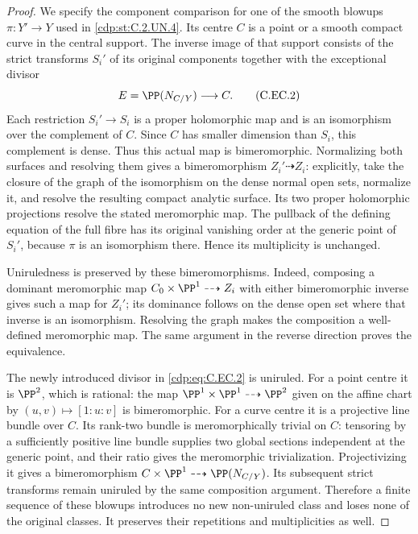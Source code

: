 \begin{proof}
We specify the component comparison for one of the smooth blowups
$\pi:Y'\to Y$ used in \ref{cdp:st:C.2.UN.4}. Its centre $C$ is a point or a
smooth compact curve in the central support. The inverse image of
that support consists of the strict transforms $S_i'$ of its
original components together with the exceptional divisor
\[
 E=\PP(N_{C/Y})\longrightarrow C.                    \tag{C.EC.2}\label{cdp:eq:C.EC.2}
\]
Each restriction $S_i'\to S_i$ is a proper holomorphic map and is an
isomorphism over the complement of $C$. Since $C$ has smaller
dimension than $S_i$, this complement is dense. Thus this actual
map is bimeromorphic. Normalizing both surfaces and resolving them
gives a bimeromorphism $Z_i'\dashrightarrow Z_i$: explicitly, take
the closure of the graph of the isomorphism on the dense normal
open sets, normalize it, and resolve the resulting compact analytic
surface. Its two proper holomorphic projections resolve the stated
meromorphic map. The pullback of the defining equation of the full
fibre has its original vanishing order at the generic point of
$S_i'$, because $\pi$ is an isomorphism there. Hence its
multiplicity is unchanged.

Uniruledness is preserved by these bimeromorphisms. Indeed, composing
a dominant meromorphic map $C_0\times\PP^1\dashrightarrow Z_i$
with either bimeromorphic inverse gives such a map for $Z_i'$; its
dominance follows on the dense open set where that inverse is an
isomorphism. Resolving the graph makes the composition a
well-defined meromorphic map. The same argument in the reverse
direction proves the equivalence.

The newly introduced divisor in \eqref{cdp:eq:C.EC.2} is uniruled. For a point
centre it is $\PP^2$, which is rational: the map
$\PP^1\times\PP^1\dashrightarrow\PP^2$ given on the affine chart
by $(u,v)\mapsto[1:u:v]$ is bimeromorphic. For a curve centre it is
a projective line bundle over $C$. Its rank-two bundle is
meromorphically trivial on $C$: tensoring by a sufficiently positive
line bundle supplies two global sections independent at the
generic point, and their ratio gives the meromorphic
trivialization. Projectivizing it gives a bimeromorphism
$C\times\PP^1\dashrightarrow\PP(N_{C/Y})$.
Its subsequent strict transforms remain uniruled by the same
composition argument. Therefore a finite sequence of these blowups
introduces no new non-uniruled class and loses none of the original
classes. It preserves their repetitions and multiplicities as well.


\end{proof}
